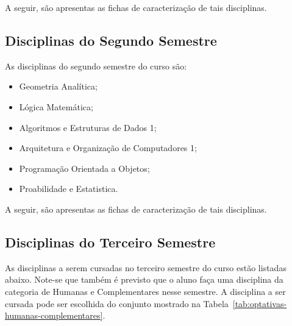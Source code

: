     A seguir, são apresentas as fichas de caracterização de tais disciplinas.

    
    
    
    
    
    
    
    
    
    
    
    
\subsection{Disciplinas do Segundo Semestre}

    As disciplinas do segundo semestre do curso são:
    
    \begin{itemize}
        \item Geometria Analítica;
        \item Lógica Matemática;
        \item Algoritmos e Estruturas de Dados 1;
        \item Arquitetura e Organização de Computadores 1;
        \item Programação Orientada a Objetos;
        \item Proabilidade e Estatistica.
    \end{itemize}

    A seguir, são apresentas as fichas de caracterização de tais disciplinas.

    
    
    

    
    
    
    
    
    
    
    
\subsection{Disciplinas do Terceiro Semestre}

    As disciplinas a serem cursadas no terceiro semestre do curso estão listadas abaixo. Note-se que também é previsto que o aluno faça uma disciplina da categoria de Humanas e Complementares nesse semestre. A disciplina a ser cursada pode ser escolhida do conjunto mostrado na Tabela~\ref{tab:optativas-humanas-complementares}.
    
